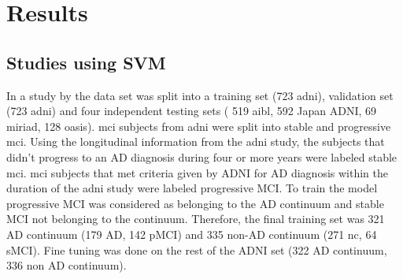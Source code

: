 \section{Results} \label{results} 

\subsection{Studies using SVM}

In a study by \textcite{syaifullahMachineLearningDiagnosis2021} the data set was split into a training set (723 \gls{adni}), validation set (723 \gls{adni}) and four independent testing sets ( 519 \gls{aibl}, 592 Japan \gls{ADNI}, 69 \gls{miriad}, 128 \gls{oasis}). \gls{mci} subjects from \gls{adni} were split into stable and progressive \gls{mci}. Using the longitudinal information from the \gls{adni} study, the subjects that didn't progress to an \gls{AD} diagnosis during four or more years were labeled stable \gls{mci}. \gls{mci} subjects that met criteria given by ADNI \autocite{Petersen201} for \gls{AD} diagnosis within the duration of the \gls{adni} study were labeled progressive MCI. To train the model progressive MCI was considered as belonging to the \gls{AD} continuum and stable MCI not belonging to the continuum. Therefore, the final training set was 321 \gls{AD} continuum (179 AD, 142 pMCI) and 335 non-AD continuum (271 \gls{nc}, 64 sMCI). Fine tuning was done on the rest of the \gls{ADNI} set (322 AD continuum, 336 non AD continuum).


